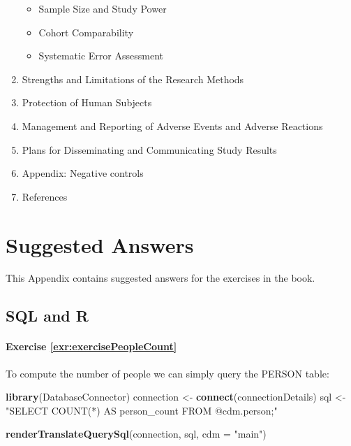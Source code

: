 \documentclass[11pt]{book}
\newenvironment{Shaded}{\begin{snugshade}}{\end{snugshade}}
\newcommand{\DataTypeTok}[1]{\textcolor[rgb]{0.13,0.29,0.53}{#1}}
\newcommand{\KeywordTok}[1]{\textcolor[rgb]{0.13,0.29,0.53}{\textbf{#1}}}
\newcommand{\NormalTok}[1]{#1}
\newcommand{\StringTok}[1]{\textcolor[rgb]{0.31,0.60,0.02}{#1}}
\providecommand{\tightlist}{%
  \setlength{\itemsep}{0pt}\setlength{\parskip}{0pt}}
\theoremstyle{definition}
\theoremstyle{definition}
\theoremstyle{definition}
\theoremstyle{remark}
\begin{document}
\begin{enumerate}
  \begin{itemize}
  \tightlist
  \item
    Sample Size and Study Power\\
  \item
    Cohort Comparability\\
  \item
    Systematic Error Assessment\\
  \end{itemize}
\item
  Strengths and Limitations of the Research Methods\\
\item
  Protection of Human Subjects\\
\item
  Management and Reporting of Adverse Events and Adverse Reactions\\
\item
  Plans for Disseminating and Communicating Study Results
\item
  Appendix: Negative controls
\item
  References
\end{enumerate}

\hypertarget{SuggestedAnswers}{%
\chapter{Suggested Answers}\label{SuggestedAnswers}}

This Appendix contains suggested answers for the exercises in the book.

\hypertarget{SqlAndRanswers}{%
\section{SQL and R}\label{SqlAndRanswers}}

\hypertarget{exercise-refexrexercisepeoplecount}{%
\subsubsection*{Exercise \ref{exr:exercisePeopleCount}}\label{exercise-refexrexercisepeoplecount}}

To compute the number of people we can simply query the PERSON table:

\begin{Shaded}
\begin{Highlighting}[]
\KeywordTok{library}\NormalTok{(DatabaseConnector)}
\NormalTok{connection <-}\StringTok{ }\KeywordTok{connect}\NormalTok{(connectionDetails)}
\NormalTok{sql <-}\StringTok{ "SELECT COUNT(*) AS person_count}
\StringTok{FROM @cdm.person;"}

\KeywordTok{renderTranslateQuerySql}\NormalTok{(connection, sql, }\DataTypeTok{cdm =} \StringTok{"main"}\NormalTok{)}
\end{Highlighting}
\end{Shaded}
\end{document}
